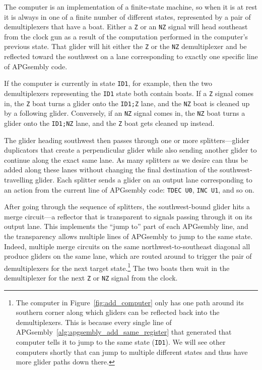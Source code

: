 The computer is an implementation of a finite-state machine, so when it is at rest it is always in one of a finite number of different states, represented by a pair of demultiplexers that have a boat. Either a \texttt{Z} or an \texttt{NZ} signal will head southeast from the clock gun as a result of the computation performed in the computer's previous state. That glider will hit either the \texttt{Z} or the \texttt{NZ} demultiplexer and be reflected toward the southwest on a lane corresponding to exactly one specific line of APGsembly code.

If the computer is currently in state \texttt{ID1}, for example, then the two demultiplexers representing the \texttt{ID1} state both contain boats. If a \texttt{Z} signal comes in, the \texttt{Z} boat turns a glider onto the \texttt{ID1;Z} lane, and the \texttt{NZ} boat is cleaned up by a following glider. Conversely, if an \texttt{NZ} signal comes in, the \texttt{NZ} boat turns a glider onto the \texttt{ID1;NZ} lane, and the \texttt{Z} boat gets cleaned up instead.

The glider heading southwest then passes through one or more splitters---glider duplicators that create a perpendicular glider while also sending another glider to continue along the exact same lane. As many splitters as we desire can thus be added along these lanes without changing the final destination of the southwest-travelling glider. Each splitter sends a glider on an output lane corresponding to an action from the current line of APGsembly code: \texttt{TDEC U0}, \texttt{INC U1}, and so on.

After going through the sequence of splitters, the southwest-bound glider hits a merge circuit---a reflector that is transparent to signals passing through it on its output lane. This implements the ``jump to'' part of each APGsembly line, and the transparency allows multiple lines of APGsembly to jump to the same state. Indeed, multiple merge circuits on the same northwest-to-southeast diagonal all produce gliders on the same lane, which are routed around to trigger the pair of demultiplexers for the next target state.\footnote{The computer in Figure~\ref{fig:add_computer} only has one path around its southern corner along which gliders can be reflected back into the demultiplexers. This is because every single line of APGsembly~\ref{alg:apgsembly_add_same_register} that generated that computer tells it to jump to the same state (\texttt{ID1}). We will see other computers shortly that can jump to multiple different states and thus have more glider paths down there.} The two boats then wait in the demultiplexer for the next \texttt{Z} or \texttt{NZ} signal from the clock.

